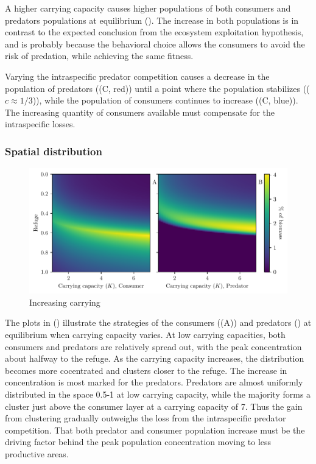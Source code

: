 A higher carrying capacity causes higher populations of both consumers and predators populations at equilibrium (). The increase in both populations is in contrast to the expected conclusion from the ecosystem exploitation hypothesis, and is probably because the behavioral choice allows the consumers to avoid the risk of predation, while achieving the same fitness.

Varying the intraspecific predator competition causes a decrease in the population of predators ((C, red)) until a point where the population stabilizes (($c\approx 1/3$)), while the population of consumers continues to increase ((C, blue)). The increasing quantity of consumers available must compensate for the intraspecific losses.

\subsubsection*{Spatial distribution}
\begin{figure}[H]
  \caption{Increasing carrying}
  \label{fig:strat_car}
  \includegraphics{plots/increasing_car_cap_c.pdf}
\end{figure}
The plots in () illustrate the strategies of the consumers ((A)) and predators () at equilibrium when carrying capacity varies. At low carrying capacities, both consumers and predators are relatively spread out, with the peak concentration about halfway to the refuge. As the carrying capacity increases, the distribution becomes more cocentrated and clusters closer to the refuge. The increase in concentration is most marked for the predators. Predators are almost uniformly distributed in the space 0.5-1 at low carrying capacity, while the majority forms a cluster just above the consumer layer at a carrying capacity of 7. Thus the gain from clustering gradually outweighs the loss from the intraspecific predator competition. That both predator and consumer population increase must be the driving factor behind the peak population concentration moving to less productive areas.

